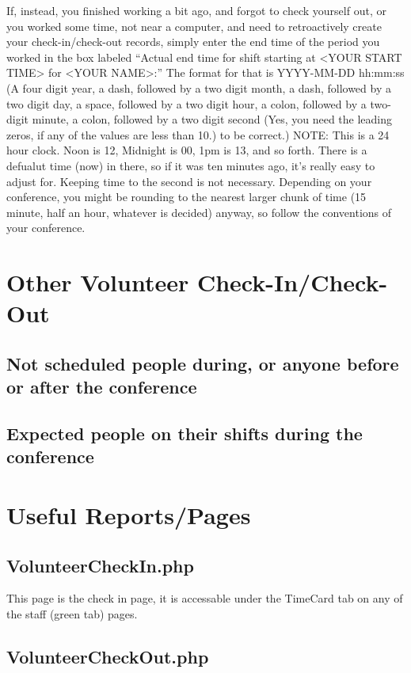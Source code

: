 \documentclass[tablesignature]{scrartcl}
\begin{document}
   If, instead, you finished working a bit ago, and forgot to check
   yourself out, or you worked some time, not near a computer, and
   need to retroactively create your check-in/check-out records,
   simply enter the end time of the period you worked in the box
   labeled ``Actual end time for shift starting at <YOUR START TIME>
   for <YOUR NAME>:'' The format for that is YYYY-MM-DD hh:mm:ss (A
   four digit year, a dash, followed by a two digit month, a dash,
   followed by a two digit day, a space, followed by a two digit hour,
   a colon, followed by a two-digit minute, a colon, followed by a two
   digit second (Yes, you need the leading zeros, if any of the values
   are less than 10.) to be correct.)  NOTE: This is a 24 hour clock.
   Noon is 12, Midnight is 00, 1pm is 13, and so forth.  There is a
   defualut time (now) in there, so if it was ten minutes ago, it's
   really easy to adjust for.  Keeping time to the second is not
   necessary.  Depending on your conference, you might be rounding to
   the nearest larger chunk of time (15 minute, half an hour, whatever
   is decided) anyway, so follow the conventions of your conference.
\section{Other Volunteer Check-In/Check-Out}
\label{sec-3}
\subsection{Not scheduled people during, or anyone before or after the conference}
\label{sec-3_1}
\subsection{Expected people on their shifts during the conference}
\label{sec-3_2}
\section{Useful Reports/Pages}
\label{sec-4}
\subsection{VolunteerCheckIn.php}
\label{sec-4_1}

\label{VolunteerCheckIn.php}

   This page is the check in page, it is accessable under the TimeCard
   tab on any of the staff (green tab) pages.
\subsection{VolunteerCheckOut.php}
\label{sec-4_2}
\end{document}
